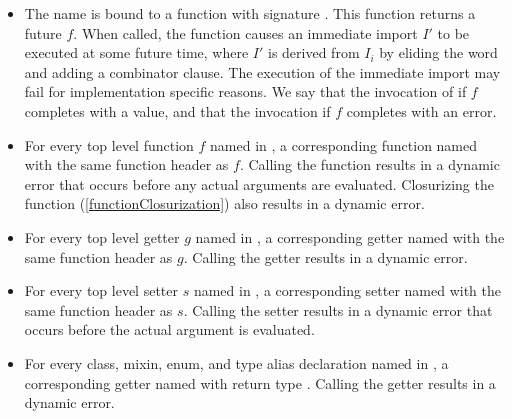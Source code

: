 \documentclass[makeidx]{article}
\begin{document}
\begin{itemize}
\item The name  is bound to
  a function with signature .
  This function returns a future $f$.
  When called, the function causes
  an immediate import $I'$ to be executed at some future time,
  where $I'$ is derived from $I_i$ by eliding the word \DEFERRED{}
  and adding a \HIDE{}  combinator clause.
  The execution of the immediate import may fail
  for implementation specific reasons.
  We say that the invocation of 
   if $f$ completes with a value,
  and that the invocation
   if $f$ completes with an error.
\item
  For every top level function $f$ named \id{} in
  ,
  a corresponding function named \id{} with the same function header as $f$.
  Calling the function results in a dynamic error that occurs before
  any actual arguments are evaluated.
  Closurizing the function
  (\ref{functionClosurization})
  also results in a dynamic error.
\item
  For every top level getter $g$ named \id{} in
  ,
  a corresponding getter named \id{} with the same function header as $g$.
  Calling the getter results in a dynamic error.
\item
  For every top level setter $s$ named \code{\id=} in
  ,
  a corresponding setter named \code{\id=} with
  the same function header as $s$.
  Calling the setter results in a dynamic error that occurs before
  the actual argument is evaluated.
\item
  For every class, mixin, enum, and type alias declaration named \id{} in
  ,
  a corresponding getter named \id{} with return type .
  Calling the getter results in a dynamic error.
\end{itemize}
\end{document}
